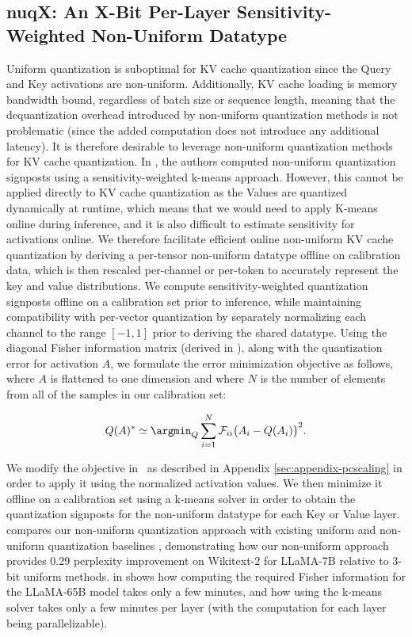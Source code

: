 \subsection{nuqX: An X-Bit Per-Layer Sensitivity-Weighted Non-Uniform Datatype}
\label{sec:method-nuq}

Uniform quantization is suboptimal for KV cache quantization since the Query and Key activations are non-uniform. Additionally, KV cache loading is memory bandwidth bound, regardless of batch size or sequence length, meaning that the dequantization overhead introduced by non-uniform quantization methods is not problematic (since the added computation does not introduce any additional latency). It is therefore desirable to leverage non-uniform quantization methods for KV cache quantization. In \cite{kim2023squeezellm}, the authors computed non-uniform quantization signposts using a sensitivity-weighted k-means approach. However, this cannot be applied directly to KV cache quantization as the Values are quantized dynamically at runtime, which means that we would need to apply K-means online during inference, and it is also difficult to estimate sensitivity for activations online. We therefore facilitate efficient online non-uniform KV cache quantization by deriving a per-tensor non-uniform datatype offline on calibration data, which is then rescaled per-channel or per-token to accurately represent the key and value distributions. We compute sensitivity-weighted quantization signposts offline on a calibration set prior to inference, while maintaining compatibility with per-vector quantization by separately normalizing each channel to the range $[-1,1]$ prior to deriving the shared datatype. Using the diagonal Fisher information matrix (derived in ), along with the quantization error for activation $A$, we formulate the error minimization objective as follows, where $A$ is flattened to one dimension and where $N$ is the number of elements from all of the samples in our calibration set:

\begin{equation}
\label{eq:fisher_kmeans}
    Q(A)^* \simeq \argmin_{Q} \sum_{i=1}^{N} \mathcal{F}_{ii} \big(A_i-Q(A_i)\big)^2.
\end{equation}

We modify the objective in~ as described in Appendix \ref{sec:appendix-pcscaling} in order to apply it using the normalized activation values. We then minimize it offline on a calibration set using a k-means solver in order to obtain the quantization signposts for the non-uniform datatype for each Key or Value layer.
 compares our non-uniform quantization approach with existing uniform and non-uniform quantization baselines \cite{dettmers2023qlora}, demonstrating how our non-uniform approach provides 0.29 perplexity improvement on Wikitext-2 for LLaMA-7B relative to 3-bit uniform methods.
 in  shows how computing the required Fisher information for the LLaMA-65B model takes only a few minutes, and how using the k-means solver takes only a few minutes per layer (with the computation for each layer being parallelizable). 

